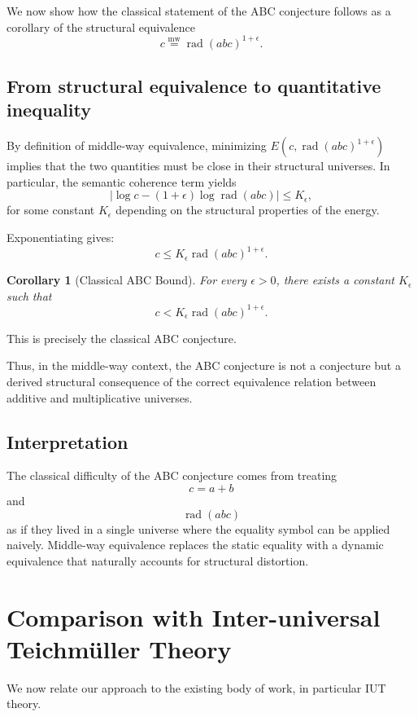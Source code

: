 \documentclass[11pt]{article}
\newcommand{\mweq}{\mathrel{\overset{\mathrm{mw}}{=}}}
\newtheorem{corollary}[theorem]{Corollary}
\theoremstyle{definition}
\theoremstyle{remark}
\begin{document}
We now show how the classical statement of the ABC conjecture follows as
a corollary of the structural equivalence
\[
  c \mweq \operatorname{rad}(abc)^{1+\epsilon}.
\]

\subsection{From structural equivalence to quantitative inequality}

By definition of middle-way equivalence, minimizing
$E(c,\operatorname{rad}(abc)^{1+\epsilon})$ implies that the two
quantities must be close in their structural universes. In particular,
the semantic coherence term yields
\[
  \left|\log c - (1+\epsilon) \log \operatorname{rad}(abc)\right|
  \leq K_{\epsilon},
\]
for some constant $K_{\epsilon}$ depending on the structural properties
of the energy.

Exponentiating gives:
\[
  c \leq K_{\epsilon} \operatorname{rad}(abc)^{1+\epsilon}.
\]

\begin{corollary}[Classical ABC Bound]
For every $\epsilon > 0$, there exists a constant $K_{\epsilon}$ such that
\[
  c < K_{\epsilon} \operatorname{rad}(abc)^{1+\epsilon}.
\]
\end{corollary}

This is precisely the classical ABC conjecture.

Thus, in the middle-way context, the ABC conjecture is not a conjecture
but a derived structural consequence of the correct equivalence relation
between additive and multiplicative universes.

\subsection{Interpretation}

The classical difficulty of the ABC conjecture comes from treating
\[
  c = a+b
\]
and
\[
  \operatorname{rad}(abc)
\]
as if they lived in a single universe where the equality symbol can be
applied naively. Middle-way equivalence replaces the static equality
with a dynamic equivalence that naturally accounts for structural
distortion.

\section{Comparison with Inter-universal Teichmüller Theory}

We now relate our approach to the existing body of work, in particular
IUT theory.
\end{document}
